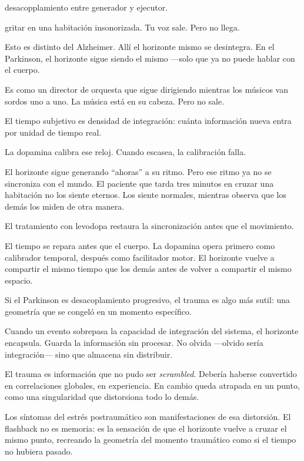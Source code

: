 \begin{fisica}
 desacopplamiento entre generador y ejecutor.

 gritar en una habitación insonorizada. Tu voz sale. Pero no llega.
\end{fisica}
Esto es distinto del Alzheimer. Allí el horizonte mismo se desintegra. En el Parkinson, el horizonte sigue siendo el mismo —solo que ya no puede hablar con el cuerpo.

Es como un director de orquesta que sigue dirigiendo mientras los músicos van sordos uno a uno. La música está en su cabeza. Pero no sale.

\noindent El tiempo subjetivo es densidad de integración: cuánta información nueva entra por unidad de tiempo real.

La dopamina calibra ese reloj. Cuando escasea, la calibración falla.

El horizonte sigue generando “ahoras” a su ritmo. Pero ese ritmo ya no se sincroniza con el mundo. El paciente que tarda tres minutos en cruzar una habitación no los siente eternos. Los siente normales, mientras observa que los demás los miden de otra manera.

El tratamiento con levodopa restaura la sincronización antes que el movimiento.

El tiempo se repara antes que el cuerpo. La dopamina opera primero como calibrador temporal, después como facilitador motor. El horizonte vuelve a compartir el mismo tiempo que los demás antes de volver a compartir el mismo espacio.

\noindent Si el Parkinson es desacoplamiento progresivo, el trauma es algo más sutil: una geometría que se congeló en un momento específico.

Cuando un evento sobrepasa la capacidad de integración del sistema, el horizonte encapsula. Guarda la información sin procesar. No olvida —olvido sería integración— sino que almacena sin distribuir.

El trauma es información que no pudo ser \emph{scrambled}. Debería haberse convertido en correlaciones globales, en experiencia. En cambio queda atrapada en un punto, como una singularidad que distorsiona todo lo demás.

Los síntomas del estrés postraumático son manifestaciones de esa distorsión. El flashback no es memoria: es la sensación de que el horizonte vuelve a cruzar el mismo punto, recreando la geometría del momento traumático como si el tiempo no hubiera pasado.

